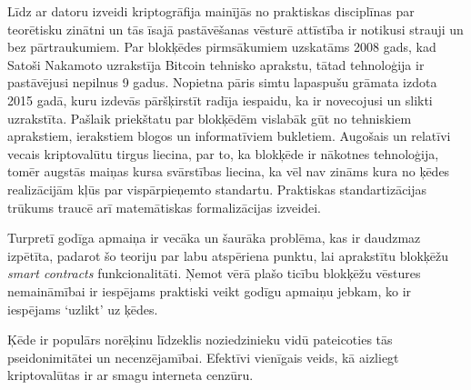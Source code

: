 Līdz ar datoru izveidi kriptogrāfija mainījās no praktiskas disciplīnas par teorētisku zinātni un tās īsajā pastāvēšanas vēsturē attīstība ir notikusi strauji un bez pārtraukumiem. Par blokķēdes pirmsākumiem uzskatāms 2008 gads, kad Satoši Nakamoto uzrakstīja Bitcoin tehnisko aprakstu, tātad tehnoloģija ir pastāvējusi nepilnus 9 gadus. Nopietna pāris simtu lapaspušu grāmata izdota 2015 gadā, kuru izdevās pāršķirstīt radīja iespaidu, ka ir novecojusi un slikti uzrakstīta. Pašlaik priekštatu par blokķēdēm vislabāk gūt no tehniskiem aprakstiem, ierakstiem blogos un informatīviem bukletiem. Augošais un relatīvi vecais kriptovalūtu tirgus liecina, par to, ka blokķēde ir nākotnes tehnoloģija, tomēr augstās maiņas kursa svārstības liecina, ka vēl nav zināms kura no ķēdes realizācijām kļūs par vispārpieņemto standartu. Praktiskas standartizācijas trūkums traucē arī matemātiskas formalizācijas izveidei.

Turpretī godīga apmaiņa ir vecāka un šaurāka problēma, kas ir daudzmaz izpētīta, padarot šo teoriju par labu atspēriena punktu, lai aprakstītu blokķēžu \textit{smart contracts} funkcionalitāti. Ņemot vērā plašo ticību blokķēžu vēstures nemaināmībai ir iespējams praktiski veikt godīgu apmaiņu jebkam, ko ir iespējams `uzlikt' uz ķēdes.

Ķēde ir populārs norēķinu līdzeklis noziedzinieku vidū pateicoties tās pseidonimitātei un necenzējamībai. Efektīvi vienīgais veids, kā aizliegt kriptovalūtas ir ar smagu interneta cenzūru.
